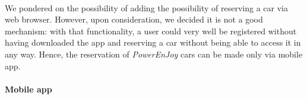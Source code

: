 	\paragraph{}We pondered on the possibility of adding the possibility of reserving a car via web browser. However, upon consideration, we decided it is not a good mechanism: with that functionality, a user could very well be registered without having downloaded the app and reserving a car without being able to access it in any way. Hence, the reservation of \textit{PowerEnJoy} cars can be made only via mobile app. 
	
	\paragraph{Mobile app}\mbox{}\\
	
